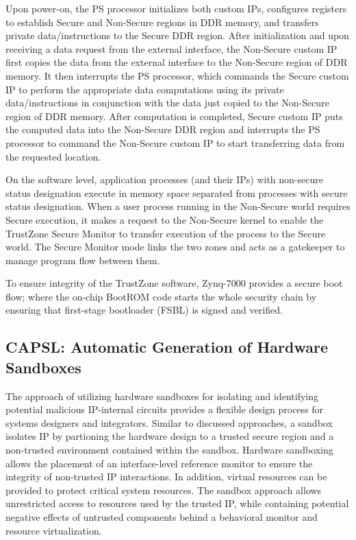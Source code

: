 \documentclass[sigconf]{acmart}
\theoremstyle{plain}
\theoremstyle{remark}
\begin{document}
Upon power-on, the PS processor initializes both custom IPs, configures registers to establish Secure and Non-Secure regions in DDR memory, and transfers private data/instructions to the Secure DDR region. After initialization and upon receiving a data request from the external interface, the
Non-Secure custom IP first copies the data from the external interface to the Non-Secure region of DDR memory. It then interrupts the PS processor, which commands the Secure custom IP to perform the appropriate data computations using its private data/instructions in conjunction with the data just copied to the Non-Secure region of DDR memory. After computation is completed, Secure custom IP puts the computed data into the Non-Secure DDR region and interrupts the PS processor to command the Non-Secure custom IP to start transferring data from the requested location.

On the software level, application processes (and their IPs) with non-secure status designation execute in memory space separated from processes with secure status designation. When a user process running in the Non-Secure world requires Secure execution, it makes a request to the Non-Secure kernel to enable the TrustZone Secure Monitor to transfer execution of the process to the Secure world. The Secure Monitor mode links the two zones and acts as a gatekeeper to manage program flow between them.

To ensure integrity of the TrustZone software, Zynq-7000 provides a secure boot flow; where the on-chip BootROM code starts the whole security chain by ensuring that first-stage bootloader (FSBL) is signed and verified.

\subsection{CAPSL: Automatic Generation of Hardware Sandboxes}\label{sec:CAPSL}
The approach of utilizing hardware sandboxes for isolating and identifying potential malicious IP-internal circuits provides a flexible design process for systems designers and integrators. Similar to discussed approaches, a sandbox isolates IP by partioning the hardware design to a trusted secure region and a non-trusted environment contained within the sandbox. Hardware sandboxing allows the placement of an interface-level reference monitor to ensure the integrity of non-trusted IP interactions. In addition, virtual resources can be provided to protect critical system resources. The sandbox approach allows unrestricted access to resources used by the trusted IP, while containing potential negative effects of untrusted components behind a behavioral monitor and resource virtualization.
\end{document}
